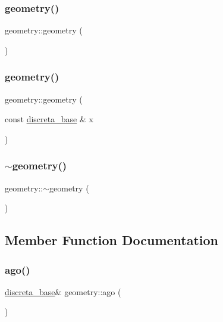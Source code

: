 \subsubsection{\texorpdfstring{geometry()}{geometry()}\hspace{0.1cm}{\footnotesize\ttfamily [1/2]}}
{\footnotesize\ttfamily geometry\+::geometry (\begin{DoxyParamCaption}{ }\end{DoxyParamCaption})}

\mbox{\label{classgeometry_adf1960feb5cc97b2d457bfc2d514af23}} 
\subsubsection{\texorpdfstring{geometry()}{geometry()}\hspace{0.1cm}{\footnotesize\ttfamily [2/2]}}
{\footnotesize\ttfamily geometry\+::geometry (\begin{DoxyParamCaption}\item[{const \mbox{\hyperlink{classdiscreta__base}{discreta\+\_\+base}} \&}]{x }\end{DoxyParamCaption})}

\mbox{\label{classgeometry_a2da654e0e19c6145b54727f0f3900a79}} 
\subsubsection{\texorpdfstring{$\sim$geometry()}{~geometry()}}
{\footnotesize\ttfamily geometry\+::$\sim$geometry (\begin{DoxyParamCaption}{ }\end{DoxyParamCaption})}



\subsection{Member Function Documentation}
\mbox{\label{classgeometry_a161d62ea84c011f07d3e64c42ee4d1ee}} 
\subsubsection{\texorpdfstring{ago()}{ago()}}
{\footnotesize\ttfamily \mbox{\hyperlink{classdiscreta__base}{discreta\+\_\+base}}\& geometry\+::ago (\begin{DoxyParamCaption}{ }\end{DoxyParamCaption})\hspace{0.3cm}{\ttfamily [inline]}}

